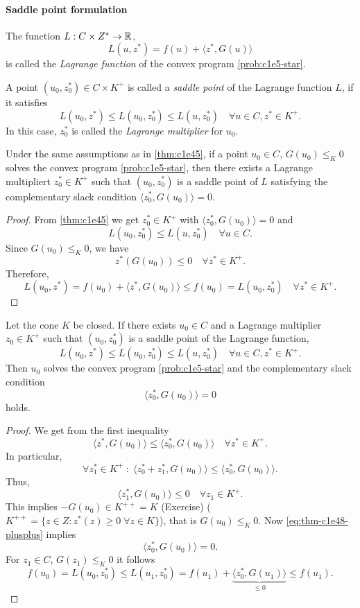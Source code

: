 \documentclass[../skript.tex]{subfiles}
\begin{document}
\paragraph{Saddle point formulation}
\begin{definition} %
\label{def:c1e46}
The function $L : C \times Z^* \to \mathbb{R}$,
\[
	L(u, z^*) = f(u) + \langle z^*, G(u) \rangle
\]
is called the \emph{Lagrange function} of the convex program \cref{prob:c1e5-star}.

A point $(u_0, z_0^*) \in C \times K^+$ is called a \emph{saddle point} of the Lagrange function $L$, if it satisfies
\[
	L(u_0, z^*) \leq L(u_0, z_0^*) \leq L(u, z_0^*) \quad \forall u \in C, z^* \in K^+.
\]
In this case, $z_0^*$ is called the \emph{Lagrange multiplier} for $u_0$.
\end{definition}
\begin{theorem} %
\label{thm:c1e47}
Under the same assumptions as in \cref{thm:c1e45}, if a point $u_0 \in C$, $G(u_0) \leq_K 0$ solves the convex program \cref{prob:c1e5-star}, then there exists a Lagrange multipliert $z_0^* \in K^+$ such that $(u_0, z_0^*)$ is a saddle point of $L$ satisfying the complementary slack condition $\langle z_0^*, G(u_0) \rangle = 0$.
\end{theorem}
\begin{proof}
From \cref{thm:c1e45} we get $z_0^* \in K^+$ with $\langle z_0^*, G(u_0) \rangle = 0$ and
\[
	L(u_0, z_0^*) \leq L(u, z_0^*) \quad \forall u \in C.
\]
Since $G(u_0) \leq_K 0$, we have 
\[
	z^*(G(u_0)) \leq 0 \quad \forall z^* \in K^+.
\]
Therefore,
\[
	L(u_0, z^*) = f(u_0) + \langle z^*, G(u_0) \rangle \leq f(u_0) = L(u_0, z_0^*) \quad \forall z^* \in K^+.
\]
\end{proof}
\begin{theorem} %
\label{thm:c1e48}
Let the cone $K$ be closed. If there exists $u_0 \in C$ and a Lagrange multiplier $z_0 \in K^+$ such that $(u_0, z_0^*)$ is a saddle point of the Lagrange function,
\[
	L(u_0, z^*) \leq L(u_0, z_0^*) \leq L(u, z_0^*) \quad \forall u \in C, z^* \in K^+.
\]
Then $u_0$ solves the convex program \cref{prob:c1e5-star} and the complementary slack condition
\[
	\langle z^*_0, G(u_0) \rangle = 0
\]
holds.
\end{theorem}
\begin{proof}
We get from the first inequality
\begin{equation}
\tag{++}
\label{eq:thm-c1e48-plusplus}
\langle z^*, G(u_0) \rangle \leq \langle z_0^*, G(u_0) \rangle \quad \forall z^* \in K^+.
\end{equation}
In particular,
\[
	\forall z_1^* \in K^+ \; : \; \langle z_0^* + z_1^*, G(u_0) \rangle \leq \langle z_0^*, G(u_0) \rangle.
\]
Thus,
\[
	\langle z_1^*, G(u_0) \rangle \leq 0 \quad \forall z_1 \in K^+.
\]
This implies $-G(u_0) \in K^{++} = K$ (Exercise) ($K^{++} = \{ z \in Z : z^*(z) \geq 0 \; \forall z \in K\}$),
that is $G(u_0) \leq_K 0$. Now \cref{eq:thm-c1e48-plusplus} implies
\[
	\langle z_0^*, G(u_0) \rangle = 0.
\]
For $z_1 \in C$, $G(z_1) \leq_K 0$ it follows
\[
	f(u_0) = L(u_0, z_0^*) \leq L(u_1, z_0^*) = f(u_1) + \underbrace{ \langle z_0^*, G(u_1) \rangle }_{\leq 0} \leq f(u_1).
\]
\end{proof}
\end{document}

